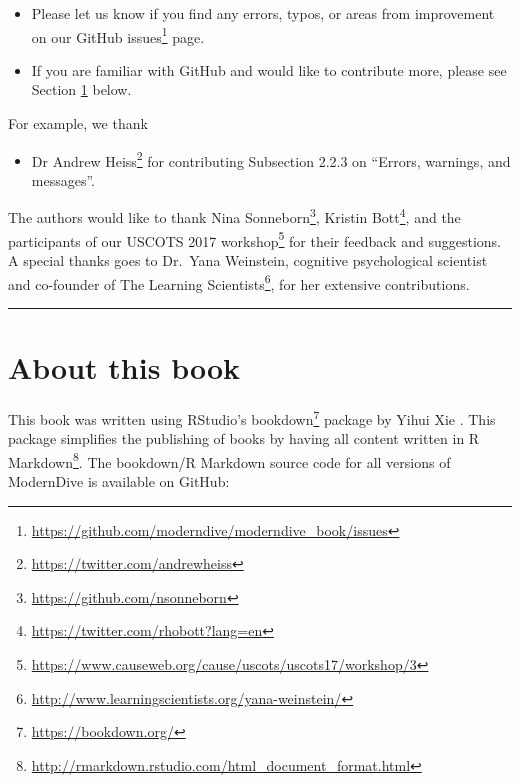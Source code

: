 \documentclass[12pt, krantz2,]{krantz}
\providecommand{\tightlist}{%
  \setlength{\itemsep}{0pt}\setlength{\parskip}{0pt}}
\renewcommand{\href}[2]{#2\footnote{\url{#1}}}
\begin{document}
\begin{itemize}
\tightlist
\item
  Please let us know if you find any errors, typos, or areas from improvement on our \href{https://github.com/moderndive/moderndive_book/issues}{GitHub issues} page.
\item
  If you are familiar with GitHub and would like to contribute more, please see Section \ref{sec:about-book} below.
\end{itemize}

For example, we thank

\begin{itemize}
\tightlist
\item
  \href{https://twitter.com/andrewheiss}{Dr Andrew Heiss} for contributing Subsection 2.2.3 on ``Errors, warnings, and messages''.
\end{itemize}

The authors would like to thank \href{https://github.com/nsonneborn}{Nina Sonneborn}, \href{https://twitter.com/rhobott?lang=en}{Kristin Bott}, and the participants of our \href{https://www.causeweb.org/cause/uscots/uscots17/workshop/3}{USCOTS 2017 workshop} for their feedback and suggestions. A special thanks goes to Dr.~Yana Weinstein, cognitive psychological scientist and co-founder of \href{http://www.learningscientists.org/yana-weinstein/}{The Learning Scientists}, for her extensive contributions.

\begin{center}\rule{0.5\linewidth}{\linethickness}\end{center}

\hypertarget{sec:about-book}{%
\section{About this book}\label{sec:about-book}}

This book was written using RStudio's \href{https://bookdown.org/}{bookdown} package by Yihui Xie \citep{R-bookdown}. This package simplifies the publishing of books by having all content written in \href{http://rmarkdown.rstudio.com/html_document_format.html}{R Markdown}. The bookdown/R Markdown source code for all versions of ModernDive is available on GitHub:
\end{document}
